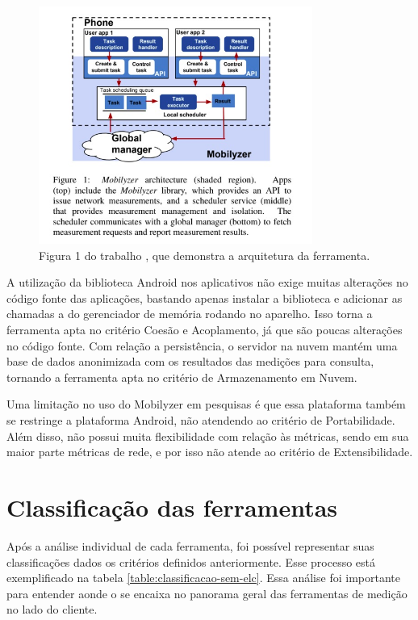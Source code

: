 \documentclass[12pt]{tcc}
\begin{document}
	\begin{figure}[!ht]
		\centering
		\includegraphics[width=0.8\textwidth]{figures/mobilyzer.jpeg}
		\caption[Fluxo da ferramenta Mobilyzer]{Figura 1 do trabalho \citep{Nikravesh2015Mobilyzer}, que demonstra a arquitetura da ferramenta. }
		\label{fig:mobilyzer}
	\end{figure}

	A utilização da biblioteca Android nos aplicativos não exige muitas alterações no código fonte das aplicações, bastando apenas instalar a biblioteca e adicionar as chamadas a  do gerenciador de memória rodando no aparelho. Isso torna a ferramenta apta no critério Coesão e Acoplamento, já que são poucas alterações no código fonte. Com relação a persistência, o servidor na nuvem mantém uma base de dados anonimizada com os resultados das medições para consulta, tornando a ferramenta apta no critério de Armazenamento em Nuvem.

	Uma limitação no uso do Mobilyzer em pesquisas é que essa plataforma também se restringe a plataforma Android, não atendendo ao critério de Portabilidade. Além disso, não possui muita flexibilidade com relação às métricas, sendo em sua maior parte métricas de rede, e por isso não atende ao critério de Extensibilidade.
		
	\section{Classificação das ferramentas}
	\label{section:analise-ferramentas}
	Após a análise individual de cada ferramenta, foi possível representar suas classificações dados os critérios definidos anteriormente. Esse processo está exemplificado na tabela \ref{table:classificacao-sem-elc}. Essa análise foi importante para entender aonde o  se encaixa no panorama geral das ferramentas de medição no lado do cliente.
\end{document}
